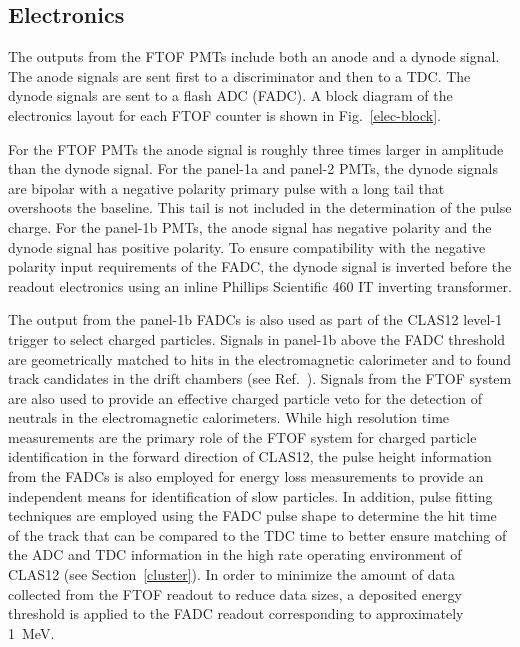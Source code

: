 \documentclass[final,3p,twocolumn]{elsarticle}
\begin{document}
\subsection{Electronics}
\label{sec-elec}

The outputs from the FTOF PMTs include both an anode and a dynode signal. The anode signals are sent
first to a discriminator and then to a TDC. The dynode signals are sent to a flash ADC (FADC). A block
diagram of the electronics layout for each FTOF counter is shown in Fig.~\ref{elec-block}.

For the FTOF PMTs the anode signal is roughly three times larger in amplitude than the dynode signal.
For the panel-1a and panel-2 PMTs, the dynode signals are bipolar with a negative polarity primary pulse
with a long tail that overshoots the baseline. This tail is not included in the determination of the pulse
charge. For the panel-1b PMTs, the anode signal has negative polarity and the dynode signal has positive
polarity. To ensure compatibility with the negative polarity input requirements of the FADC, the dynode
signal is inverted before the readout electronics using an inline Phillips Scientific 460 IT inverting
transformer.

The output from the panel-1b FADCs is also used as part of the CLAS12 level-1 trigger to select charged
particles. Signals in panel-1b above the FADC threshold are geometrically matched to hits in the
electromagnetic calorimeter and to found track candidates in the drift chambers (see Ref.~\cite{trigger-nim}).
Signals from the FTOF system are also used to provide an effective charged particle veto for the detection of
neutrals in the electromagnetic calorimeters. While high resolution time measurements are the primary role of
the FTOF system for charged particle identification in the forward direction of CLAS12, the pulse height
information from the FADCs is also employed for energy loss measurements to provide an independent
means for identification of slow particles. In addition, pulse fitting techniques are employed using the
FADC pulse shape to determine the hit time of the track that can be compared to the TDC time to better
ensure matching of the ADC and TDC information in the high rate operating environment of CLAS12 (see
Section~\ref{cluster}). In order to minimize the amount of data collected from the FTOF readout to reduce
data sizes, a deposited energy threshold is applied to the FADC readout corresponding to approximately 1~MeV.
\end{document}
